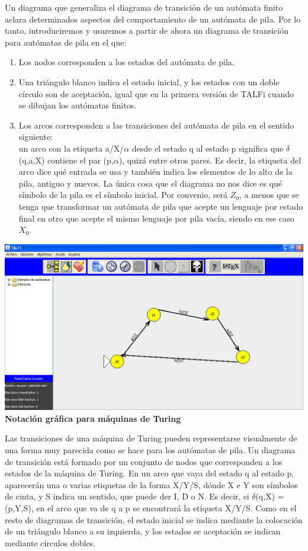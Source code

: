 \documentclass[12pt,a4paper,spanish]{book}
\begin{document}
Un diagrama que generaliza el diagrama de transici\'on de un aut\'omata finito
aclara determinados aspectos del comportamiento de un aut\'omata de pila. Por lo
tanto, introduciremos y usaremos a partir de ahora un diagrama de transici\'on para
aut\'omatas de pila en el que:
\begin{enumerate}
\item Los nodos corresponden a los estados del aut\'omata de pila.
\item Una tri\'angulo blanco indica el estado inicial, y los estados con un doble c\'irculo
son de aceptaci\'on, igual que en la primera versi\'on de TALFi cuando se dibujan los
aut\'omatas finitos.
\item Los arcos corresponden a las transiciones del aut\'omata de pila en el sentido
siguiente:\\ un arco con la etiqueta a/X/$\alpha$ desde el estado q al estado p significa
que $\delta$(q,a,X) contiene el par (p,$\alpha$), quiz\'a entre otros pares. Es decir, la
etiqueta del arco dice qu\'e entrada se usa y tambi\'en indica los elementos de lo alto
de la pila, antiguo y nuevos.
La \'unica cosa que el diagrama no nos dice es qu\'e s\'imbolo de la pila es el s\'imbolo
inicial. Por convenio, ser\'a $Z_{0}$, a menos que se tenga que transformar un
aut\'omata de pila que acepte un lenguaje por estado final en otro que acepte el mismo
lenguaje por pila vac\'ia, siendo en ese caso $X_{0}$.\\
\end{enumerate}
\includegraphics[width=\textwidth]{graficoaristasparapila.jpg} \\
{\bf Notaci\'on gr\'afica para m\'aquinas de Turing\\}


Las transiciones de una m\'aquina de Turing pueden representarse visualmente de
una forma muy parecida como se hace para los aut\'omatas de pila. Un diagrama de
transici\'on est\'a formado por un conjunto de nodos que corresponden a los estados
de la m\'aquina de Turing. En un arco que vaya del estado q al estado p, aparecer\'an
una o varias etiquetas de la forma X/Y/S, d\'onde X e Y son s\'imbolos de cinta, y S
indica un sentido, que puede der I, D o N. Es decir, si $\delta$(q,X) = (p,Y,S), en el
arco que va de q a p se encontrar\'a la etiqueta X/Y/S.
Como en el resto de diagramas de transici\'on, el estado inicial se indica mediante la
colocaci\'on de un tri\'angulo blanco a su izquierda, y los estados se aceptaci\'on se
indican mediante c\'irculos dobles.
\end{document}
